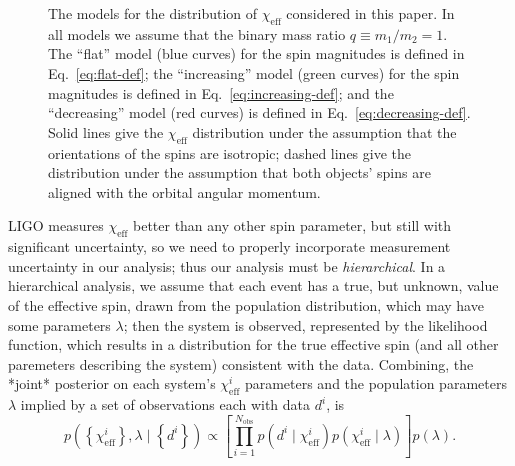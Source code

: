 \documentclass[modern]{aastex61}
\newcommand{\chieff}{\chi_\mathrm{eff}}
\begin{document}
\begin{figure}
  \caption{\label{fig:chieff-distribution-models} The models for the
    distribution of $\chieff$ considered in this paper.  In all models
    we assume that the binary mass ratio $q \equiv m_1/m_2 = 1$.  The
    ``flat'' model (blue curves) for the spin magnitudes is defined in
    Eq.\ \eqref{eq:flat-def}; the ``increasing'' model (green curves)
    for the spin magnitudes is defined in Eq.\
    \eqref{eq:increasing-def}; and the ``decreasing'' model (red
    curves) is defined in Eq.\ \eqref{eq:decreasing-def}.  Solid lines
    give the $\chieff$ distribution under the assumption that the
    orientations of the spins are isotropic; dashed lines give the
    distribution under the assumption that both objects' spins are
    aligned with the orbital angular momentum.}
\end{figure}

LIGO measures $\chieff$ better than any other spin parameter, but
still with significant uncertainty, so we need to properly incorporate
measurement uncertainty in our analysis; thus our analysis must be
\emph{hierarchical}.  In a hierarchical analysis, we assume that each
event has a true, but unknown, value of the effective spin, drawn from
the population distribution, which may have some parameters $\lambda$;
then the system is observed, represented by the likelihood function,
which results in a distribution for the true effective spin (and all
other paremeters describing the system) consistent with the data.
Combining, the *joint* posterior on each system's $\chieff^i$
parameters and the population parameters $\lambda$ implied by a set of
observations each with data $d^i$, is
\begin{equation}
  p\left( \left\{ \chieff^i \right\}, \lambda \mid \left\{ d^i \right\} \right) \propto \left[ \prod_{i=1}^{N_\mathrm{obs}} p\left(d^i \mid \chieff^i \right) p\left( \chieff^i \mid \lambda \right) \right] p\left(\lambda\right).
\end{equation}
\end{document}
